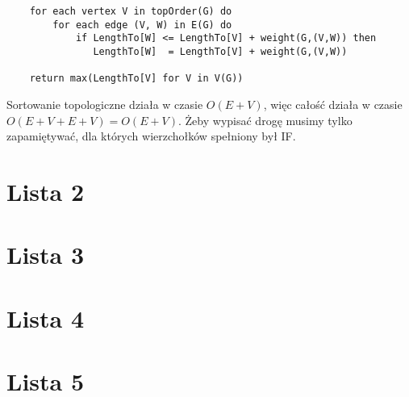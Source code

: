 \documentclass[svgnames]{report}
\begin{document}
\begin{lstlisting}
    for each vertex V in topOrder(G) do
        for each edge (V, W) in E(G) do
            if LengthTo[W] <= LengthTo[V] + weight(G,(V,W)) then
               LengthTo[W]  = LengthTo[V] + weight(G,(V,W))
 
    return max(LengthTo[V] for V in V(G))
\end{lstlisting}

Sortowanie topologiczne działa w czasie $O(E+V)$, więc całość działa w czasie $O(E+V+E+V) = O(E+V)$.
Żeby wypisać drogę musimy tylko zapamiętywać, dla których wierzchołków spełniony był IF.


\chapter{Lista 2}

\chapter{Lista 3}

\chapter{Lista 4}

\chapter{Lista 5}
\end{document}
